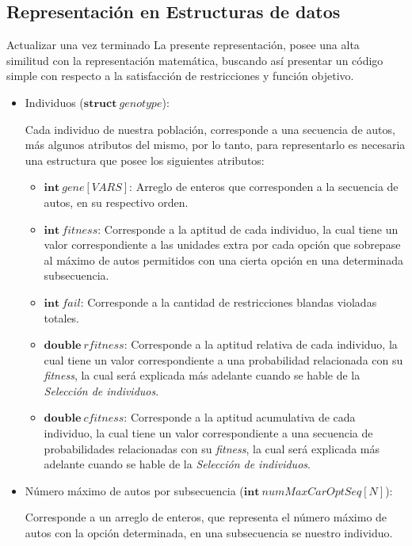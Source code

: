 \subsection{Representación en Estructuras de datos}
\vspace{2cm}
Actualizar una vez terminado
\vspace{2cm}
La presente representación, posee una alta similitud con la representación matemática, buscando así presentar un código simple
con respecto a la satisfacción de restricciones y función objetivo.

\begin{itemize}
	\item Individuos ($\textbf{struct}\ genotype$):
				
		Cada individuo de nuestra población, corresponde a una secuencia de autos, más algunos atributos del mismo, por lo tanto,
		para representarlo es necesaria una estructura que posee los siguientes atributos:
		\begin{itemize}
			\item $\textbf{int}\ gene[VARS]$: Arreglo de enteros que corresponden  a la secuencia de autos, en su respectivo orden.
			\item $\textbf{int}\ fitness$: Corresponde a la aptitud de cada individuo, la cual tiene un valor correspondiente a las unidades
				extra por cada opción que sobrepase al máximo de autos permitidos con una cierta opción en una determinada subsecuencia.
			\item $\textbf{int}\ fail$: Corresponde a la cantidad de restricciones blandas violadas totales.
			\item $\textbf{double}\ rfitness$: Corresponde a la aptitud relativa de cada individuo, la cual tiene un valor correspondiente
				a una probabilidad relacionada con su \emph{fitness}, la cual será explicada más adelante cuando se hable de la \emph{Selección de
				individuos}.
			\item $\textbf{double}\ cfitness$: Corresponde a la aptitud acumulativa de cada individuo, la cual tiene un valor correspondiente
				a una secuencia de probabilidades relacionadas con su \emph{fitness}, la cual será explicada más adelante cuando se hable de la \emph{Selección
				de individuos}.
		\end{itemize}

	\item Número máximo de autos por subsecuencia ($\textbf{int}\ numMaxCarOptSeq[N]$):
	
		Corresponde a un arreglo de enteros, que representa el número máximo de autos con la opción determinada, en una subsecuencia se nuestro individuo.



\end{itemize}
